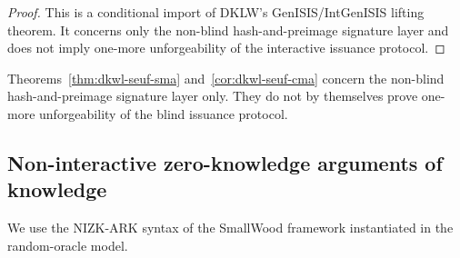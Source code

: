 \begin{proof}
This is a conditional import of DKLW's GenISIS/IntGenISIS lifting theorem.  It concerns only the non-blind
hash-and-preimage signature layer and does not imply one-more unforgeability of the interactive issuance
protocol.
\end{proof}

\begin{remark}\label{rem:dkwl-scope}
Theorems~\ref{thm:dkwl-seuf-sma} and~\ref{cor:dkwl-seuf-cma} concern the non-blind hash-and-preimage
signature layer only.  They do not by themselves prove one-more unforgeability of the blind issuance
protocol.
\end{remark}

\subsection{Non-interactive zero-knowledge arguments of knowledge}
\label{subsec:prelim-nizk}
\label{subsec:nizk-ark}
We use the NIZK-ARK syntax of the SmallWood framework instantiated in the random-oracle model.

